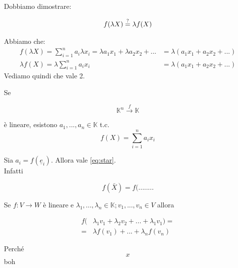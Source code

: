\begin{dimostrazione}[Punto 2.]

  Dobbiamo dimostrare:

  \begin{equation}
    f(\lambda X) \overset{?}{=} \lambda f(X)\\
  \end{equation}

  Abbiamo che:
  \begin{align*}
    f(\lambda X) =\sum_{i=1}^{n}a_i\lambda x_i = \lambda a_1x_1 + \lambda a_2x_2 + ... & = \lambda(a_1x_1 + a_2x_2 + ...)\\
    \lambda f(X) =\lambda \sum_{i=1}^{n}a_ix_i & = \lambda(a_1x_1 + a_2x_2 + ...)
  \end{align*}
  Vediamo quindi che vale 2.

\end{dimostrazione}


\begin{osservazione}[]

  Se

  \begin{displaymath}
    \mathbb{K}^n \xrightarrow{f} \mathbb{K}
  \end{displaymath}

  è lineare, esistono $a_1,...,a_n\in \mathbb{K}$ t.c.
  \begin{equation}
    f(X)=\sum_{i=1}^{n}a_ix_i
    \label{eq:star}
  \end{equation}

  \begin{dimostrazione}[]

    Sia $a_i=f(\underline{e}_i)$. Allora vale \ref{eq:star}.\\
    Infatti

    \begin{equation}
      f(\bar{X})=f(........
    \end{equation}

  \end{dimostrazione}

\end{osservazione}

\begin{osservazione}[]
  Se $f:V\to W$ è lineare e $\lambda_1,...,\lambda_n\in \mathbb{K}; v_1,...,v_n\in V$ allora

  \begin{align}\label{oss}
     f(&\lambda_1v_1+\lambda_2v_2+...+\lambda_1v_1)=\\
     = &\lambda f(v_1)+...+\lambda_n f(v_n)
  \end{align}

  Perché
  \begin{equation}
    x
  \end{equation}
  boh

\end{osservazione}

